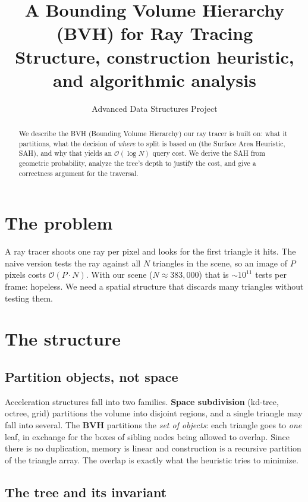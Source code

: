 \documentclass[11pt]{article}
\title{A Bounding Volume Hierarchy (BVH) for Ray Tracing \\
       \large Structure, construction heuristic, and algorithmic analysis}
\author{Advanced Data Structures Project}
\date{}
\begin{document}
\maketitle

\begin{abstract}
We describe the BVH (Bounding Volume Hierarchy) our ray tracer is built on: what
it partitions, what the decision of \emph{where} to split is based on (the Surface
Area Heuristic, SAH), and why that yields an $\mathcal{O}(\log N)$ query cost. We
derive the SAH from geometric probability, analyze the tree's depth to justify the
cost, and give a correctness argument for the traversal.
\end{abstract}

\section{The problem}

A ray tracer shoots one ray per pixel and looks for the first triangle it hits.
The naive version tests the ray against all $N$ triangles in the scene, so an
image of $P$ pixels costs $\mathcal{O}(P\cdot N)$. With our scene
($N \approx 383{,}000$) that is $\sim 10^{11}$ tests per frame: hopeless. We need a
spatial structure that discards many triangles without testing them.

\section{The structure}

\subsection{Partition objects, not space}

Acceleration structures fall into two families. \textbf{Space subdivision}
(kd-tree, octree, grid) partitions the volume into disjoint regions, and a single
triangle may fall into several. The \textbf{BVH} partitions the \emph{set of
objects}: each triangle goes to \emph{one} leaf, in exchange for the boxes of
sibling nodes being allowed to overlap. Since there is no duplication, memory is
linear and construction is a recursive partition of the triangle array. The
overlap is exactly what the heuristic tries to minimize.

\subsection{The tree and its invariant}
\end{document}
